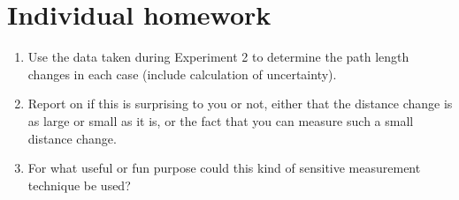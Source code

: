 \section{Individual homework}

\begin{enumerate}
	\item Use the data taken during Experiment 2 to determine the path length changes in each case (include calculation of uncertainty).
	
	\item Report on if this is surprising to you or not, either that the distance change is as large or small as it is, or the fact that you can measure such a small distance change.
	
	\item For what useful or fun purpose could this kind of sensitive measurement technique be used?
\end{enumerate}
